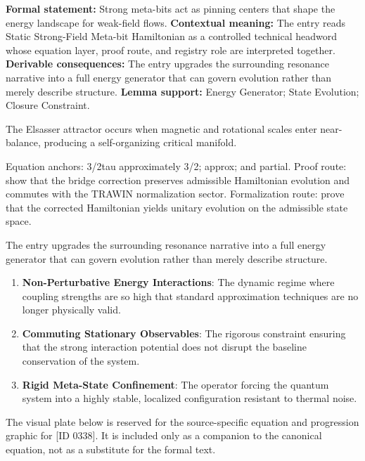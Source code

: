 \begingroup\footnotesize\setlength{\emergencystretch}{3em}\sloppy
\textbf{Formal statement:} Strong meta-bits act as pinning centers that shape the energy landscape for weak-field flows. \textbf{Contextual meaning:} The entry reads Static Strong-Field Meta-bit Hamiltonian as a controlled technical headword whose equation layer, proof route, and registry role are interpreted together. \textbf{Derivable consequences:} The entry upgrades the surrounding resonance narrative into a full energy generator that can govern evolution rather than merely describe structure. \textbf{Lemma support:} Energy Generator; State Evolution; Closure Constraint.\par
\endgroup

The Elsasser attractor occurs when magnetic and rotational scales enter near-balance, producing a self-organizing critical manifold.

Equation anchors: 3/2tau approximately 3/2; approx; and partial. Proof route: show that the bridge correction preserves admissible Hamiltonian evolution and commutes with the TRAWIN normalization sector. Formalization route: prove that the corrected Hamiltonian yields unitary evolution on the admissible state space.

The entry upgrades the surrounding resonance narrative into a full energy generator that can govern evolution rather than merely describe structure.
\endgroup

\begin{enumerate}[leftmargin=1.6em,itemsep=6pt,topsep=4pt]
\item \textbf{Non-Perturbative Energy Interactions}: The dynamic regime where coupling strengths are so high that standard approximation techniques are no longer physically valid.
\item \textbf{Commuting Stationary Observables}: The rigorous constraint ensuring that the strong interaction potential does not disrupt the baseline conservation of the system.
\item \textbf{Rigid Meta-State Confinement}: The operator forcing the quantum system into a highly stable, localized configuration resistant to thermal noise.
\end{enumerate}

\begingroup\footnotesize\sloppy
The visual plate below is reserved for the source-specific equation and progression graphic for [ID 0338]. It is included only as a companion to the canonical equation, not as a substitute for the formal text.
\par\endgroup
\ifTZPDarkEdition
{}
\fi

